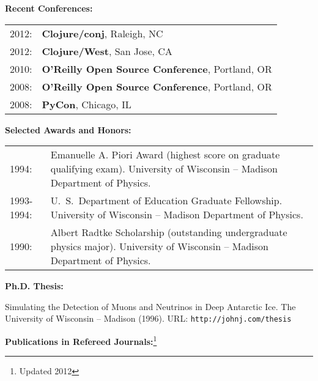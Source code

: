 {\bf Recent Conferences:}
\vspace{0.25cm}

\begin{tabular}[t]{lp{}}

2012: & {\bf Clojure/conj}, Raleigh, NC\\
2012: & {\bf Clojure/West}, San Jose, CA\\
2010: & {\bf O'Reilly Open Source Conference}, Portland, OR\\
2008: & {\bf O'Reilly Open Source Conference}, Portland, OR\\
2008: & {\bf PyCon}, Chicago, IL\\
\end{tabular}

\newpage

{\bf Selected Awards and Honors:}
\vspace{0.25cm}

\begin{tabular}[t]{lp{}}

1994: & Emanuelle A. Piori Award (highest score on graduate qualifying exam).
University of Wisconsin -- Madison Department of Physics.\\[0.25cm]

1993-1994: & U.~S.~Department of Education Graduate Fellowship.  
University of Wisconsin -- Madison Department of Physics.\\[0.25cm]

1990: & Albert Radtke Scholarship (outstanding undergraduate physics major).
University of Wisconsin -- Madison Department of Physics.\\[0.25cm]

\end{tabular}

{\bf Ph.D. Thesis:}

Simulating the Detection of Muons and Neutrinos in Deep Antarctic Ice. The University of Wisconsin -- Madison (1996).  URL: {\tt http://johnj.com/thesis}
\vspace{0.25cm}

{\bf Publications in Refereed Journals:}\footnote{Updated 2012}

